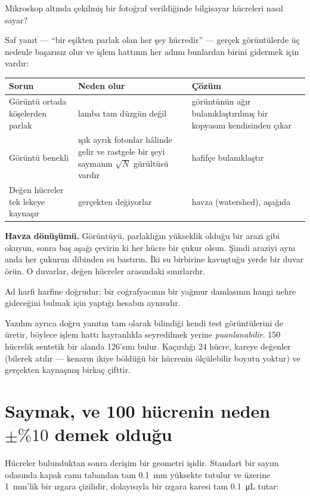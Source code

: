 \documentclass[11pt,a4paper]{article}
\begin{document}
Mikroskop altında çekilmiş bir fotoğraf verildiğinde bilgisayar hücreleri nasıl
sayar?

Saf yanıt --- ``bir eşikten parlak olan her şey hücredir'' --- gerçek
görüntülerde üç nedenle başarısız olur ve işlem hattının her adımı bunlardan
birini gidermek için vardır:

\begin{center}\small
\begin{tabular}{p{4.4cm}p{4.9cm}p{4.9cm}}
\toprule
\textbf{Sorun} & \textbf{Neden olur} & \textbf{Çözüm} \\
\midrule
Görüntü ortada köşelerden parlak &
lamba tam düzgün değil &
görüntünün ağır bulanıklaştırılmış bir kopyasını kendisinden çıkar \\[4pt]
Görüntü benekli &
ışık ayrık fotonlar hâlinde gelir ve rastgele bir şeyi saymanın $\sqrt{N}$
gürültüsü vardır &
hafifçe bulanıklaştır \\[4pt]
Değen hücreler tek lekeye kaynaşır &
gerçekten değiyorlar &
havza (watershed), aşağıda \\
\bottomrule
\end{tabular}
\end{center}

\begin{analogy}
\textbf{Havza dönüşümü.} Görüntüyü, parlaklığın yükseklik olduğu bir arazi gibi
okuyun, sonra baş aşağı çevirin ki her hücre bir çukur olsun. Şimdi araziyi aynı
anda her çukurun dibinden su bastırın. İki su birbirine kavuştuğu yerde bir duvar
örün. O duvarlar, değen hücreler arasındaki sınırlardır.

Ad harfi harfine doğrudur: bir coğrafyacının bir yağmur damlasının hangi nehre
gideceğini bulmak için yaptığı hesabın aynısıdır.
\end{analogy}

Yazılım ayrıca doğru yanıtın tam olarak bilindiği kendi test görüntülerini de
üretir, böylece işlem hattı hayranlıkla seyredilmek yerine \emph{puanlanabilir}.
150 hücrelik sentetik bir alanda 126'sını bulur. Kaçırdığı 24 hücre, kareye
değenler (bilerek atılır --- kenarın ikiye böldüğü bir hücrenin ölçülebilir
boyutu yoktur) ve gerçekten kaynaşmış birkaç çifttir.

\section{Saymak, ve 100 hücrenin neden $\pm\%10$ demek olduğu}

Hücreler bulunduktan sonra derişim bir geometri işidir. Standart bir sayım
odasında kapak camı tabandan tam \SI{0,1}{\milli\meter} yüksekte tutulur ve
üzerine \SI{1}{\milli\meter}'lik bir ızgara çizilidir, dolayısıyla bir ızgara
karesi tam \SI{0,1}{\micro\liter} tutar:
\end{document}
